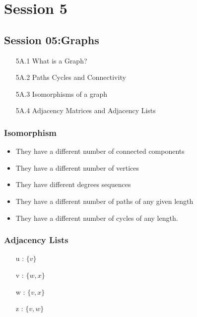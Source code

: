 \documentclass[]{report}
\begin{document}
\chapter{Session 5}

\newpage
\section*{Session 05:Graphs}
\begin{itemize}
\item[5A.1] What is a Graph?
\item[5A.2] Paths Cycles and Connectivity
\item[5A.3] Isomorphisms of a graph
\item[5A.4] Adjacency Matrices and Adjacency Lists
\end{itemize}


\subsection*{Isomorphism}
\begin{itemize}
\item They have a different number of connected components
\item They have a different number of vertices
\item They have different degrees sequences
\item They have a different number of paths of any given length
\item They have a different number of cycles of any length.
\end{itemize}

\subsection*{Adjacency Lists}
\begin{itemize}
\item[u]: $\{v\}$
\item[v]: $\{w,x\}$
\item[w]: $\{v,x\}$
\item[z]: $\{v,w\}$
\end{itemize}
\end{document}
